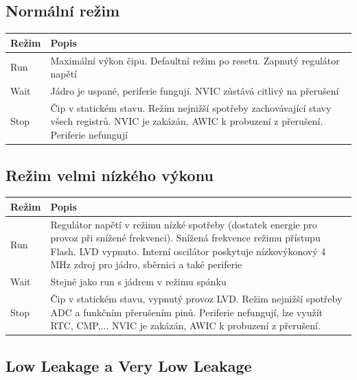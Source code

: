 \documentclass{article}
\begin{document}
\subsection{Normální režim}

\begin{tabularx}{\textwidth}{|>{\centering\arraybackslash}p{}|X|}
    \hline
    \textbf{Režim} & \textbf{Popis} \\
    \hline
    Run & Maximální výkon čipu. Defaultní režim po resetu. Zapnutý regulátor
    napětí \\
    \hline
    Wait & Jádro je uspané, periferie fungují. NVIC zůstává citlivý na
    přerušení \\
    \hline
    Stop & Čip v statickém stavu. Režim nejnižší spotřeby zachovávající stavy
    všech registrů. NVIC je zakázán, AWIC k probuzení z přerušení. Periferie
    nefungují \\
    \hline
\end{tabularx}

\subsection{Režim velmi nízkého výkonu}

\begin{tabularx}{\textwidth}{|>{\centering\arraybackslash}p{}|X|}
    \hline
    \textbf{Režim} & \textbf{Popis} \\
    \hline
    Run & Regulátor napětí v režimu nízké spotřeby (dostatek energie pro
    provoz při snížené frekvenci). Snížená frekvence režimu přístupu Flash.
    LVD vypnuto. Interní oscilátor poskytuje nízkovýkonový 4 MHz zdroj pro
    jádro, sběrnici a také periferie \\
    \hline
    Wait & Stejné jako run s jádrem v režimu spánku \\
    \hline
    Stop & Čip v statickém stavu, vypnutý provoz LVD. Režim nejnižší spotřeby
    ADC a funkčním přerušením pinů. Periferie nefungují, lze využít RTC,
    CMP,... NVIC je zakázán, AWIC k probuzení z přerušení. \\
    \hline
\end{tabularx}

\subsection{Low Leakage a Very Low Leakage}
\end{document}
